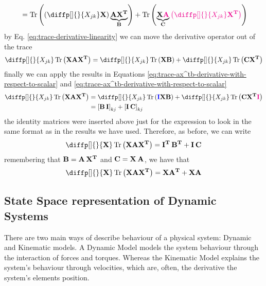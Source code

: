 \documentclass[12pt]{article}
\begin{document}
\begin{enumerate}
\begin{equation*}
\begin{aligned}
            &= \Tr\parentheses{\parentheses{\diffp[]{}{X_{jk}} \mat{X}} \underbrace{\mat{A X^T}}_{\mat{B}}} + \Tr\parentheses{\underbrace{\mat{X \magenta{A}}}_{\mat{C}}\magenta{\parentheses{\diffp[]{}{X_{jk}} \mat{X^T}}}}\\
        \end{aligned}
    \end{equation*}
    by Eq. \ref{eq:trace-derivative-linearity} we can move the derivative operator out of the trace
    \begin{equation*}
        \diffp[]{}{X_{jk}} \Tr\parentheses{\mat{X A X^T}} = \diffp[]{}{X_{jk}} \Tr\parentheses{\mat{X B}} + \diffp[]{}{X_{jk}}\Tr\parentheses{\mat{C X^T}}
    \end{equation*}
    finally we can apply the results in Equations \ref{eq:trace-ax^tb-derivative-with-respect-to-scalar} and \ref{eq:trace-ax^tb-derivative-with-respect-to-scalar}
    \begin{equation*}
        \begin{aligned}
        \diffp[]{}{X_{jk}} \Tr\parentheses{\mat{X A X^T}} &= \diffp[]{}{X_{jk}} \Tr\parentheses{\mat{\blue{I} X B}} + \diffp[]{}{X_{jk}}\Tr\parentheses{\mat{C X^T \magenta{I}}} \\
        &= \brac{\mat{B\,I}}_{kj} + \brac{\mat{I\,C}}_{kj}
        \end{aligned}
    \end{equation*}
    the identity matrices were inserted above just for the expression to look in the same format as in the results we have used. Therefore, as before, we can write
    \begin{equation*}
        \diffp[]{}{\mat{X}} \Tr\parentheses{\mat{X A X^T}} = \mat{I^T \, B^T} + \mat{I\, C}
    \end{equation*}
    remembering that $\boldsymbol{\mathbf{B}} = \boldsymbol{\mathbf{A\,X^T}}$ and $\boldsymbol{\mathbf{C}} = \boldsymbol{\mathbf{X \, A}}$, we have that
    \begin{equation}
        \diffp[]{}{\mat{X}} \Tr\parentheses{\mat{X A X^T}} = \mat{X A^T} + \mat{X A}
        \label{eq:trace-xax^t-derivative}
    \end{equation}
\end{enumerate}


\subsection{State Space representation of Dynamic Systems}
There are two main ways of describe behaviour of a physical system: Dynamic and Kinematic models. A Dynamic Model models the system behaviour through the interaction of forces and torques. Whereas the Kinematic Model explains the system's behaviour through velocities, which are, often, the derivative the system's elements position.
\end{document}
